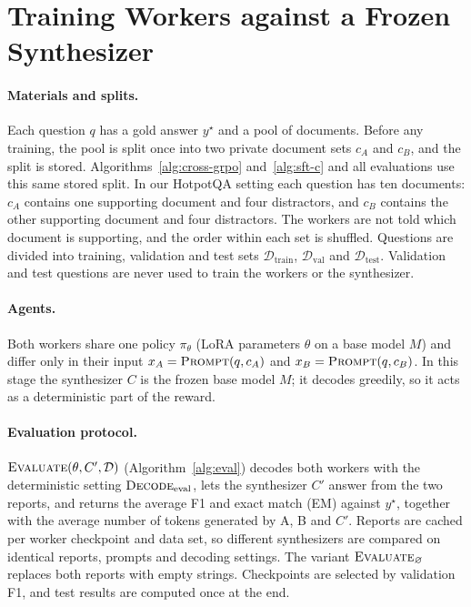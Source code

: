 \documentclass[11pt]{article}
\begin{document}
\section*{Training Workers against a Frozen Synthesizer}

\paragraph{Materials and splits.}
Each question $q$ has a gold answer $y^\star$ and a pool of documents.
Before any training, the pool is split once into two private document sets
$c_A$ and $c_B$, and the split is stored. Algorithms~\ref{alg:cross-grpo}
and~\ref{alg:sft-c} and all evaluations use this same stored split. In our
HotpotQA setting each question has ten documents: $c_A$ contains one
supporting document and four distractors, and $c_B$ contains the other
supporting document and four distractors. The workers are not told which
document is supporting, and the order within each set is shuffled.
Questions are divided into training, validation and test sets
$\mathcal{D}_{\mathrm{train}}$, $\mathcal{D}_{\mathrm{val}}$ and
$\mathcal{D}_{\mathrm{test}}$. Validation and test questions are never used
to train the workers or the synthesizer.

\paragraph{Agents.}
Both workers share one policy $\pi_\theta$ (LoRA parameters $\theta$ on a
base model $M$) and differ only in their input
$x_A = \textsc{Prompt}(q, c_A)$ and $x_B = \textsc{Prompt}(q, c_B)$.
In this stage the synthesizer $C$ is the frozen base model $M$; it decodes
greedily, so it acts as a deterministic part of the reward.

\paragraph{Evaluation protocol.}
$\textsc{Evaluate}(\theta, C', \mathcal{D})$ (Algorithm~\ref{alg:eval})
decodes both workers with the
deterministic setting $\textsc{Decode}_{\mathrm{eval}}$, lets the synthesizer
$C'$ answer from the two reports, and returns the average F1 and exact match
(EM) against $y^\star$, together with the average number of tokens generated
by A, B and $C'$. Reports are cached per worker checkpoint and data set, so
different synthesizers are compared on identical reports, prompts and
decoding settings. The variant $\textsc{Evaluate}_{\varnothing}$ replaces
both reports with empty strings. Checkpoints are selected by validation F1,
and test results are computed once at the end.
\end{document}
